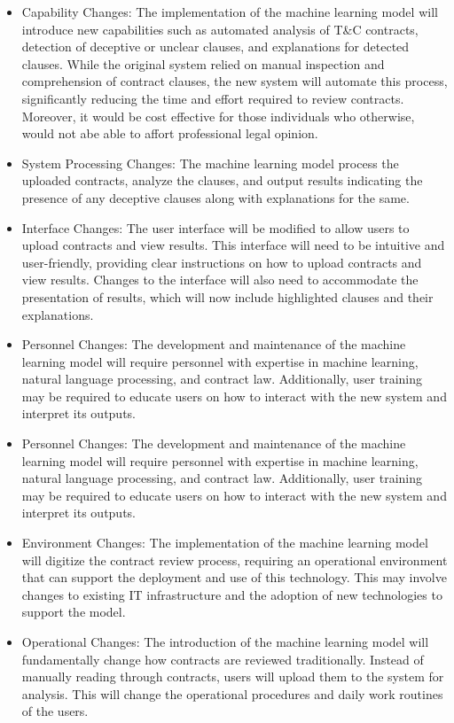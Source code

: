 \begin{itemize}
    \item Capability Changes: The implementation of the machine learning model will introduce new capabilities such as automated analysis of T&C contracts, detection of deceptive or unclear clauses, and explanations for detected clauses. While the original system relied on manual inspection and comprehension of contract clauses, the new system will automate this process, significantly reducing the time and effort required to review contracts. Moreover, it would be cost effective for those individuals who otherwise, would not abe able to affort professional legal opinion.
    \item System Processing Changes: The machine learning model process the uploaded contracts, analyze the clauses, and output results indicating the presence of any deceptive clauses along with explanations for the same. 
    \item  Interface Changes: The user interface will be modified to allow users to upload contracts and view results. This interface will need to be intuitive and user-friendly, providing clear instructions on how to upload contracts and view results. Changes to the interface will also need to accommodate the presentation of results, which will now include highlighted clauses and their explanations.
    \item Personnel Changes: The development and maintenance of the machine learning model will require personnel with expertise in machine learning, natural language processing, and contract law. Additionally, user training may be required to educate users on how to interact with the new system and interpret its outputs.
    \item Personnel Changes: The development and maintenance of the machine learning model will require personnel with expertise in machine learning, natural language processing, and contract law. Additionally, user training may be required to educate users on how to interact with the new system and interpret its outputs.
    \item Environment Changes: The implementation of the machine learning model will digitize the contract review process, requiring an operational environment that can support the deployment and use of this technology. This may involve changes to existing IT infrastructure and the adoption of new technologies to support the model.
    \item Operational Changes: The introduction of the machine learning model will fundamentally change how contracts are reviewed traditionally. Instead of manually reading through contracts, users will upload them to the system for analysis. This will change the operational procedures and daily work routines of the users.

\end{itemize}
